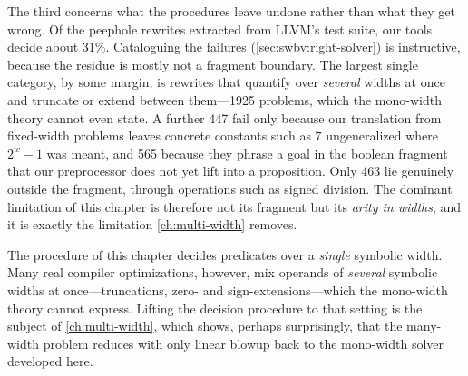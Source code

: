The third concerns what the procedures leave undone rather than what they get
wrong. Of the \InstCombineTotalProblems{} peephole rewrites extracted from LLVM's
test suite, our tools decide about 31\%. Cataloguing the failures
(\cref{sec:swbv:right-solver}) is instructive, because the residue is mostly not
a fragment boundary. The largest single category, by some margin, is rewrites
that quantify over \emph{several} widths at once and truncate or extend between
them---1925 problems, which the mono-width theory cannot even state. A further
447 fail only because our translation from fixed-width problems leaves concrete
constants such as $7$ ungeneralized where $2^w - 1$ was meant, and 565 because
they phrase a goal in the boolean fragment that our preprocessor does not yet
lift into a proposition. Only 463 lie genuinely outside the fragment, through
operations such as signed division. The dominant limitation of this chapter is
therefore not its fragment but its \emph{arity in widths}, and it is exactly the
limitation \cref{ch:multi-width} removes.

The procedure of this chapter decides predicates over a \emph{single} symbolic
width. Many real compiler optimizations, however, mix operands of \emph{several}
symbolic widths at once---truncations, zero- and sign-extensions---which the
mono-width theory cannot express. Lifting the decision procedure to that setting
is the subject of \cref{ch:multi-width}, which shows, perhaps surprisingly, that
the many-width problem reduces with only linear blowup back to the mono-width
solver developed here.
